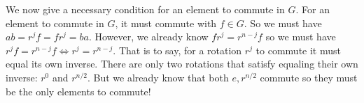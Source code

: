 \documentclass[11pt]{article}
\begin{document}
\begin{exercise}{47}{24}
{\begin{enumerate}[label=(\alph*)]
            We now give a necessary condition for an element to commute in $G$.
            For an element to commute in $G$, it must commute with $f \in G$.
            So we must have $ab = r^j f = fr^j = ba$.
            However, we already know $fr^j = r^{n-j}f$ so we must have $r^j f = r^{n-j}f \iff r^j = r^{n-j}$.
            That is to say, for a rotation $r^j$ to commute it must equal its own inverse.
            There are only two rotations that satisfy equaling their own inverse: $r^0$ and $r^{n/2}$.
            But we already know that both $e, r^{n/2}$ commute so they must be the only elements to commute!
        \end{enumerate}
    }
\end{exercise}


\newpage
\end{document}
